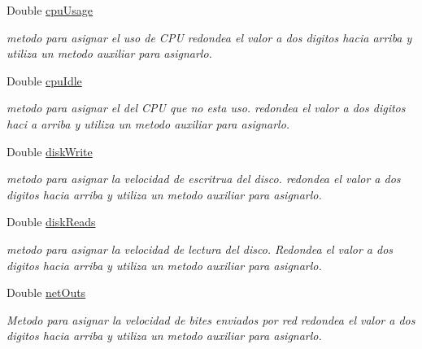 \begin{DoxyCompactItemize}
\item 
Double \hyperlink{class_windows_forms_application1_1_1_form1_ae445eb3f9ea10205e542590e77476e47}{cpu\+Usage}
\begin{DoxyCompactList}\small\item\em metodo para asignar el uso de C\+P\+U redondea el valor a dos digitos hacia arriba y utiliza un metodo auxiliar para asignarlo. \end{DoxyCompactList}\item 
Double \hyperlink{class_windows_forms_application1_1_1_form1_af1ec7463a818d88cbf71689bbd444ab8}{cpu\+Idle}
\begin{DoxyCompactList}\small\item\em metodo para asignar el del C\+P\+U que no esta uso. redondea el valor a dos digitos haci a arriba y utiliza un metodo auxiliar para asignarlo. \end{DoxyCompactList}\item 
Double \hyperlink{class_windows_forms_application1_1_1_form1_a21165d5313e265bc99107b4bcb60cdad}{disk\+Write}
\begin{DoxyCompactList}\small\item\em metodo para asignar la velocidad de escritrua del disco. redondea el valor a dos digitos hacia arriba y utiliza un metodo auxiliar para asignarlo. \end{DoxyCompactList}\item 
Double \hyperlink{class_windows_forms_application1_1_1_form1_a99946d55dca3d347b344e9810b15a6d2}{disk\+Reads}
\begin{DoxyCompactList}\small\item\em metodo para asignar la velocidad de lectura del disco. Redondea el valor a dos digitos hacia arriba y utiliza un metodo auxiliar para asignarlo. \end{DoxyCompactList}\item 
Double \hyperlink{class_windows_forms_application1_1_1_form1_a50fa7fa857eb7587ab11e7b2c502f240}{net\+Outs}
\begin{DoxyCompactList}\small\item\em Metodo para asignar la velocidad de bites enviados por red redondea el valor a dos digitos hacia arriba y utiliza un metodo auxiliar para asignarlo. \end{DoxyCompactList}\item 

\end{DoxyCompactItemize}
